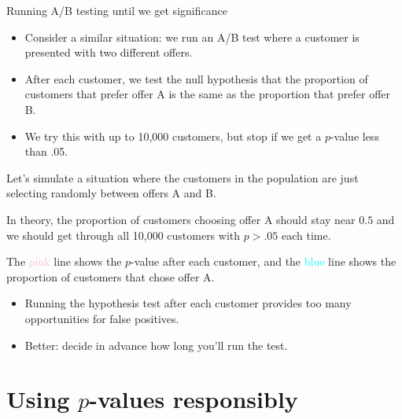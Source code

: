 \documentclass{beamer}\usepackage[]{graphicx}\usepackage[]{color}
\newenvironment{knitrout}{}{} %
\begin{document}
\begin{darkframes}
    \begin{frame}{Running A/B testing until we get significance}
      \begin{itemize}[<+->]
        \item Consider a similar situation: we run an A/B test where a customer is presented with two different offers.
        \item After each customer, we test the null hypothesis that the proportion of customers that prefer offer A is the same as the proportion that prefer offer B.
        \item We try this with up to 10,000 customers, but stop if we get a $p$-value less than .05.
      \end{itemize}
    \end{frame}

    \begin{frame}
      Let's simulate a situation where the customers in the population are just selecting randomly between offers A and B.

      \bigskip\pause

      In theory, the proportion of customers choosing offer A should stay near $0.5$ and we should get through all 10,000 customers with $p>.05$ each time.
    \end{frame}

    \begin{frame}
      The \textcolor{pink}{pink} line shows the $p$-value after each customer, and the \textcolor{cyan}{blue} line shows the proportion of customers that chose offer A.
\begin{knitrout}


\end{knitrout}
    \end{frame}

    \begin{frame}
      \begin{itemize}
        \item Running the hypothesis test after each customer provides too many opportunities for false positives.
        \item Better: decide in advance how long you'll run the test.
      \end{itemize}
    \end{frame}

    \section{Using $p$-values responsibly}


\end{darkframes}
\end{document}
